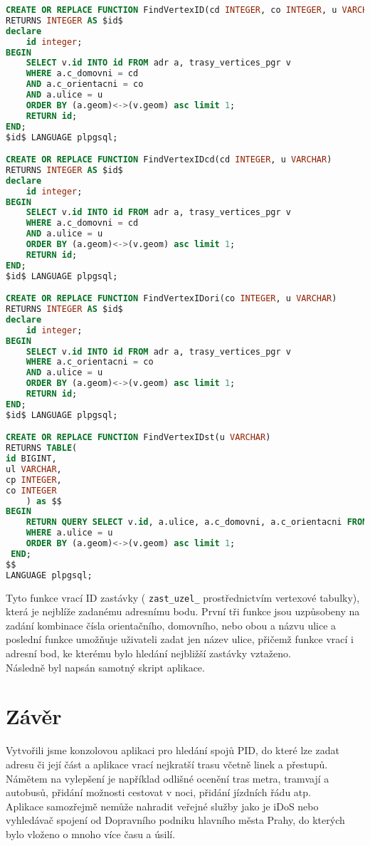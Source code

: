 \documentclass[a4paper, 12pt]{article}
\begin{document}
\begin{lstlisting}[language=sql]
CREATE OR REPLACE FUNCTION FindVertexID(cd INTEGER, co INTEGER, u VARCHAR)
RETURNS INTEGER AS $id$
declare 
	id integer;
BEGIN 
	SELECT v.id INTO id FROM adr a, trasy_vertices_pgr v 
	WHERE a.c_domovni = cd 
	AND a.c_orientacni = co 
	AND a.ulice = u
	ORDER BY (a.geom)<->(v.geom) asc limit 1;
	RETURN id;
END;
$id$ LANGUAGE plpgsql;

CREATE OR REPLACE FUNCTION FindVertexIDcd(cd INTEGER, u VARCHAR)
RETURNS INTEGER AS $id$
declare 
	id integer;
BEGIN 
	SELECT v.id INTO id FROM adr a, trasy_vertices_pgr v 
	WHERE a.c_domovni = cd 
	AND a.ulice = u
	ORDER BY (a.geom)<->(v.geom) asc limit 1;
	RETURN id;
END;
$id$ LANGUAGE plpgsql;

CREATE OR REPLACE FUNCTION FindVertexIDori(co INTEGER, u VARCHAR)
RETURNS INTEGER AS $id$
declare 
	id integer;
BEGIN 
	SELECT v.id INTO id FROM adr a, trasy_vertices_pgr v 
	WHERE a.c_orientacni = co
	AND a.ulice = u
	ORDER BY (a.geom)<->(v.geom) asc limit 1;
	RETURN id;
END;
$id$ LANGUAGE plpgsql;

CREATE OR REPLACE FUNCTION FindVertexIDst(u VARCHAR)
RETURNS TABLE(
id BIGINT,
ul VARCHAR,
cp INTEGER,
co INTEGER
	) as $$
BEGIN 
	RETURN QUERY SELECT v.id, a.ulice, a.c_domovni, a.c_orientacni FROM adr a, trasy_vertices_pgr v 
	WHERE a.ulice = u
	ORDER BY (a.geom)<->(v.geom) asc limit 1;
 END; 
$$
LANGUAGE plpgsql;
\end{lstlisting} 
Tyto funkce vrací ID zastávky ( \texttt{zast\_uzel\_} prostřednictvím vertexové tabulky), která je nejblíže zadanému adresnímu bodu. První tři funkce jsou uzpůsobeny na zadání kombinace čísla orientačního, domovního, nebo obou a názvu ulice a poslední funkce umožňuje uživateli zadat jen název ulice, přičemž funkce vrací i adresní bod, ke kterému bylo hledání nejbližší zastávky vztaženo. \\

Následně byl napsán samotný skript aplikace.

\section{Závěr}
\indent Vytvořili jsme konzolovou aplikaci pro hledání spojů PID, do které lze zadat adresu či její část a aplikace vrací nejkratší trasu včetně linek a přestupů. Námětem na vylepšení je například odlišné ocenění tras metra, tramvají a autobusů, přidání možnosti cestovat v noci, přidání jízdních řádu atp. \\
\indent Aplikace samozřejmě nemůže nahradit veřejné služby jako je iDoS nebo  vyhledávač spojení od Dopravního podniku hlavního města Prahy, do kterých bylo vloženo o mnoho více času a úsilí. 
\end{document}
